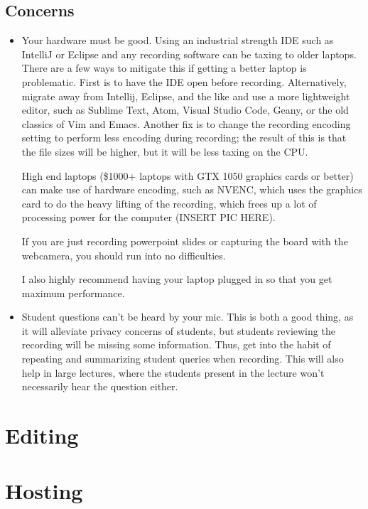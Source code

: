 \documentclass[sigconf]{acmart}
\begin{document}
\subsection{Concerns}
\begin{itemize}
	\item Your hardware must be good. Using an industrial strength IDE such as IntelliJ or Eclipse and any recording software can be taxing to older laptops.
	There are a few  ways to mitigate this  if getting a better laptop is problematic. 
	First is to have the IDE open before recording.
	Alternatively, migrate away from Intellij, Eclipse, and the like and use a more lightweight editor, such as Sublime Text, Atom, Visual Studio Code, Geany, or the old classics of Vim and Emacs.
	Another fix is to change the recording encoding setting to perform less encoding during recording; the result of this is that the file sizes will be higher, but it will be less taxing on the CPU.
	
	High end laptops (\$1000+ laptops with GTX 1050 graphics cards or better) can make use of hardware encoding, such as NVENC, which uses the graphics card to do the heavy lifting of the recording, which frees up a lot of processing power for the computer (INSERT PIC HERE).
	
	
	If you are just recording powerpoint slides or capturing the board with the webcamera, you should run into no difficulties.
	
	I also highly recommend having your laptop plugged in  so that you get maximum performance.
	\item Student questions can't be heard by your mic.  This is both a good thing, as it will alleviate privacy concerns of students, but students  reviewing the recording will be missing some information.  Thus, get into the habit of repeating and summarizing student queries when recording.  This will also help in large lectures, where the students present in the lecture won't necessarily hear the question either.
	
\end{itemize}

\section{Editing}
\label{edit}

\section{Hosting}
\label{hosting}
\end{document}
